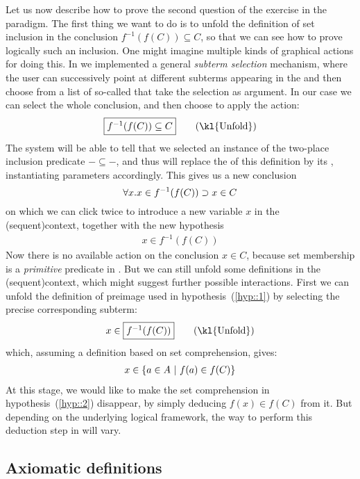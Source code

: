 \AP
Let us now describe how to prove the second question of the exercise in the
 paradigm. The first thing we want to do is to unfold the definition of
set inclusion in the conclusion $f^{-1}(f(C)) \subseteq C$, so that we can see
how to prove logically such an inclusion. One might imagine multiple kinds of
graphical actions for doing this. In  we implemented a general
\emph{subterm selection} mechanism, where the user can successively point at
different subterms appearing in the  and then choose from a list of
so-called  that take the selection as argument. In our
case we can select the whole conclusion, and then choose to apply the
 action:
$$\select{f^{-1}(f(C)) \subseteq C} \qquad \text{(\kl{Unfold})}$$
The system will be able to tell that we selected an instance of the two-place
inclusion predicate $- \subseteq -$, and thus will replace the 
of this definition by its , instantiating parameters accordingly. This
gives us a new conclusion
$$\forall x. x \in f^{-1}(f(C)) \supset x \in C$$
on which we can click twice to introduce a new variable $x$ in the \kl(sequent){context},
together with the new hypothesis
\begin{gather}
  x \in f^{-1}(f(C)) \label{hyp::1}
\end{gather}
Now there is no available action on the conclusion $x \in C$, because set
membership is a \emph{primitive} predicate in . But we can still
unfold some definitions in the \kl(sequent){context}, which might suggest
further possible interactions. First we can unfold the definition of preimage
used in hypothesis~(\ref{hyp::1}) by selecting the precise corresponding
subterm:
$$x \in \select{f^{-1}(f(C))} \qquad \text{(\kl{Unfold})}$$
which, assuming a definition based on set comprehension, gives:
\begin{gather}
  x \in \left\{a \in A ~\middle|~ f(a) \in f(C)\right\} \label{hyp::2}
\end{gather}
At this stage, we would like to make the set comprehension in
hypothesis~(\ref{hyp::2}) disappear, by simply deducing $f(x) \in f(C)$ from it.
But depending on the underlying logical framework, the way to perform this
deduction step in  will vary.

\subsection{Axiomatic definitions}


